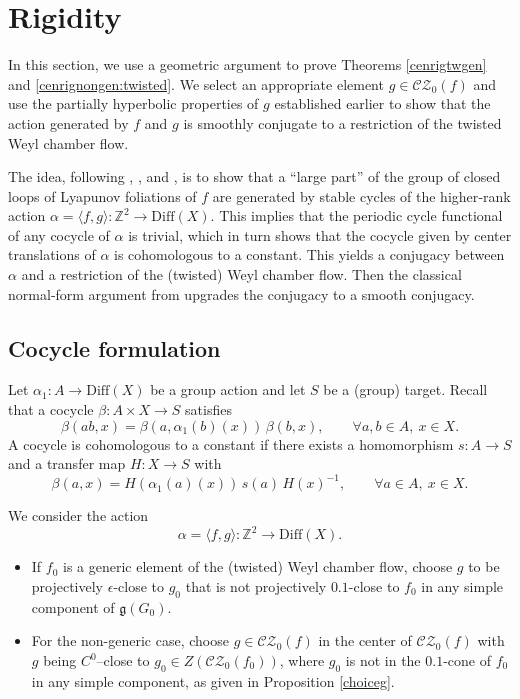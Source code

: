 \documentclass[11pt]{amsart}
\numberwithin{equation}{section}
\newcommand{\Z}{\mathbb{Z}}
\newcommand{\CZ}{\mathcal{CZ}}
\theoremstyle{plain}
\begin{document}
\section{Rigidity}\label{sec:cocrig}

In this section, we use a geometric argument to prove Theorems
\ref{cenrigtwgen} and \ref{cenrignongen:twisted}. We select an appropriate
element $g\in\CZ_0(f)$ and use the partially hyperbolic properties of $g$
established earlier to show that the action generated by $f$ and $g$ is
smoothly conjugate to a restriction of the twisted Weyl chamber flow.

The idea, following \cite{DK}, \cite{Vinhage}, and \cite{VinWang}, is to
show that a ``large part'' of the group of closed loops of Lyapunov
foliations of $f$ are generated by stable cycles of the higher‑rank
action $\alpha=\langle f,g\rangle:\Z^2\to\mathrm{Diff}(X)$. This implies
that the periodic cycle functional of any cocycle of $\alpha$ is
trivial, which in turn shows that the cocycle given by center
translations of $\alpha$ is cohomologous to a constant. This yields a
conjugacy between $\alpha$ and a restriction of the (twisted) Weyl
chamber flow. Then the classical normal‑form argument  from \cite{KS} upgrades the conjugacy
to a smooth conjugacy.

\subsection{Cocycle formulation}

Let $\alpha_1:A\to\mathrm{Diff}(X)$ be a group action and let $S$ be a
(group) target. Recall that a cocycle $\beta:A\times X\to S$ satisfies
\[
\beta(ab,x)=\beta(a,\alpha_1(b)(x))\,\beta(b,x),\qquad\forall a,b\in A,\ x\in X.
\]
A cocycle is cohomologous to a constant if there exists a homomorphism
$s:A\to S$ and a transfer map $H:X\to S$ with
\[
\beta(a,x)=H(\alpha_1(a)(x))\,s(a)\,H(x)^{-1},\qquad\forall a\in A,\ x\in X.
\]

We consider the action
\[
\alpha=\langle f,g\rangle:\Z^2\to\mathrm{Diff}(X).
\]

\begin{itemize}
    \item If $f_0$ is a generic element of the (twisted) Weyl chamber flow, choose $g$ to be projectively $\epsilon$-close to $g_0$ that is not projectively $0.1$-close to $f_0$ in any simple component of $\mathfrak{g}(G_0)$.

    \item For the non-generic case, choose
  $g\in\CZ_0(f)$ in the center of $\CZ_0(f)$ with $g$ being $C^0$–close to
  $g_0\in Z(\CZ_0(f_0))$, where \(g_0\) is not in the \(0.1\)-cone of \(f_0\) in any simple component, as given in Proposition \ref{choiceg}.
\end{itemize}
\end{document}

